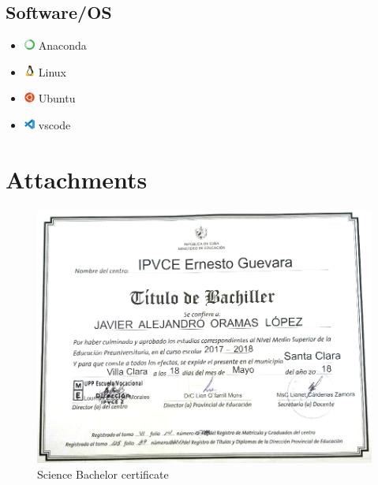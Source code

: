 \documentclass{article}
\begin{document}
\begin{multicols}{3}
\section*{Software/OS}
\begin{itemize}
    \item \includegraphics[height=10pt]{images/icons/anaconda-original.png} Anaconda
    \item \includegraphics[height=10pt]{images/icons/linux-original.png} Linux
    \item \includegraphics[height=10pt]{images/icons/ubuntu-plain.png} Ubuntu
    \item \includegraphics[height=10pt]{images/icons/vscode-original.png} vscode
\end{itemize}

\end{multicols}

\newpage
\section*{Attachments}
\begin{figure}[h]
    \includegraphics[width=\textwidth]{images/bachelor.png}
    \caption{Science Bachelor certificate}
    \label{sec:bachelor}
\end{figure}
\end{document}
